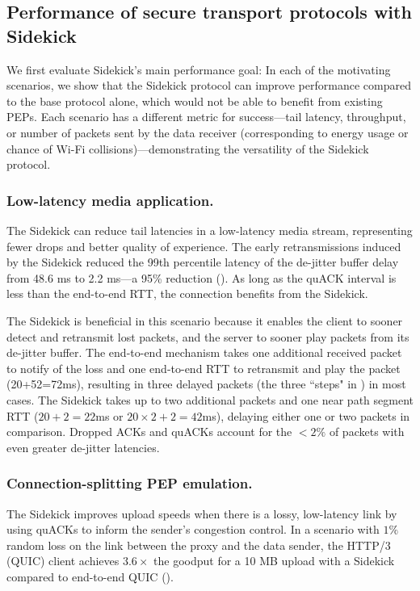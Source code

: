 \subsection{Performance of secure transport protocols with Sidekick}
\label{sec:sidekick:emulation:performance}

We first evaluate Sidekick's main performance goal: In each of the motivating
scenarios, we show that the Sidekick protocol can improve performance compared
to the base protocol alone, which would not be able to benefit from existing
PEPs. Each scenario has a different metric for success---tail latency,
throughput, or number of packets sent by the data receiver (corresponding to
energy usage or chance of Wi-Fi collisions)---demonstrating the versatility of
the Sidekick protocol.

\subsubsection{Low-latency media application.}

The Sidekick can reduce tail latencies in a low-latency media stream,
representing fewer drops and better quality of experience. The early
retransmissions induced by the Sidekick reduced the 99th percentile latency of
the de-jitter buffer delay from 48.6 ms to 2.2 ms---a 95\% reduction
(). As long as the quACK interval is less
than the end-to-end RTT, the connection benefits from the Sidekick.

The Sidekick is beneficial in this scenario because it enables the client to
sooner detect and retransmit lost packets, and the server to sooner play
packets from its de-jitter buffer. The end-to-end mechanism takes one
additional received packet to notify of the loss and one end-to-end RTT to
retransmit and play the packet (20+52=72ms), resulting in three delayed
packets (the three ``steps" in ) in most
cases. The Sidekick takes up to two additional packets and one near path
segment RTT ($20+2=22$ms or $20\times2+2=42$ms), delaying either one or two
packets in comparison. Dropped ACKs and quACKs account for the $<2\%$ of
packets with even greater de-jitter latencies.

\subsubsection{Connection-splitting PEP emulation.}

The Sidekick improves upload speeds when there is a lossy, low-latency link
by using quACKs to inform the sender's congestion control.
In a scenario with $1\%$ random loss on the link between the proxy and the
data sender, the HTTP/3 (QUIC) client achieves $3.6\times$ the goodput for a
10 MB upload with a Sidekick compared to end-to-end QUIC
().

